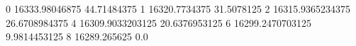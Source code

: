 0 16333.98046875 44.71484375
1 16320.7734375 31.5078125
2 16315.9365234375 26.6708984375
4 16309.9033203125 20.6376953125
6 16299.2470703125 9.9814453125
8 16289.265625 0.0
